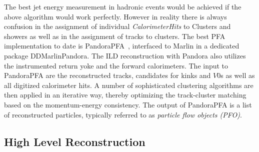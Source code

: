  The best jet energy measurement in hadronic events would be achieved if the above algorithm would work perfectly. However in reality
 there is always confusion in the assignment of individual \emph{CalorimeterHits} to Clusters and showers as well as in the assignment
 of tracks to clusters. The best PFA implementation to date is PandoraPFA~\cite{Marshall:2015rfa},  interfaced to Marlin in a dedicated package
 DDMarlinPandora. The ILD reconstruction with Pandora also utilizes the instrumented return yoke and the forward calorimeters.
 The input to PandoraPFA are the reconstructed tracks, candidates for  kinks and  $V0$s as well as all digitized calorimeter hits.
 A number of sophisticated clustering algorithms are then applied in an iterative way, thereby optimizing the track-cluster matching
 based on the momentum-energy consistency. The output of PandoraPFA is a list of reconstructed particles, typically referred to as
 \emph{particle flow objects (PFO)}.

\subsection{High Level Reconstruction}

